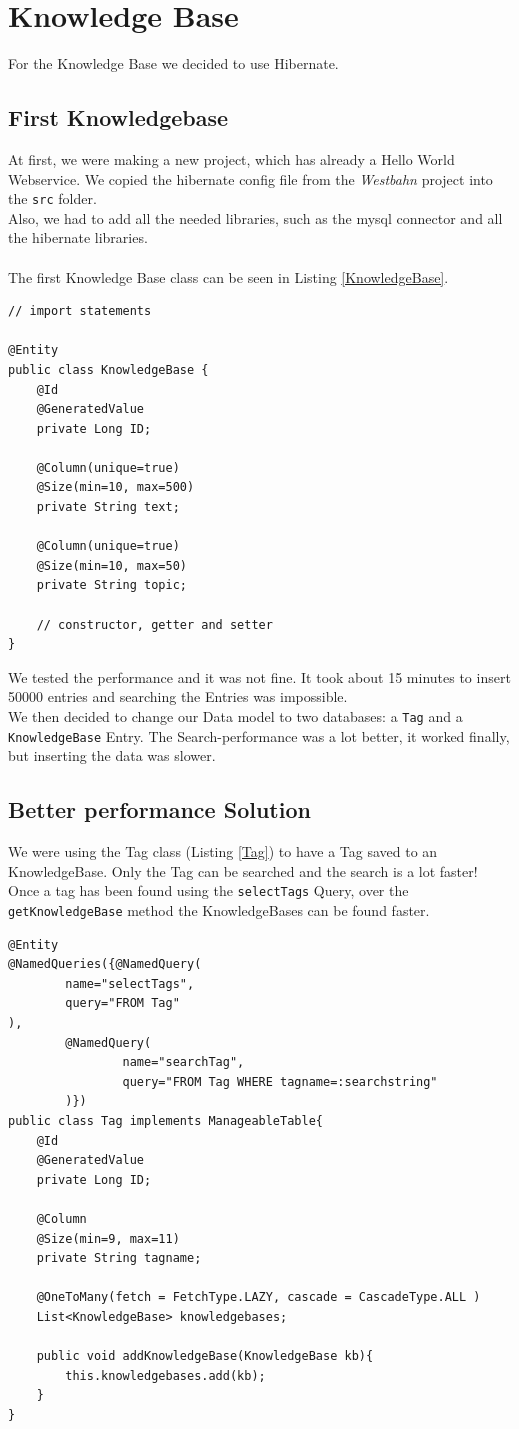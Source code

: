 \documentclass[12pt]{article}
\begin{document}
\section{Knowledge Base}
For the Knowledge Base we decided to use Hibernate.
\subsection{First Knowledgebase}
At first, we were making a new project, which has already a Hello World Webservice. We copied the hibernate config file from the \textit{Westbahn} project into the \texttt{src} folder.\\
Also, we had to add all the needed libraries, such as the mysql connector and all the hibernate libraries.\\
\\
The first Knowledge Base class can be seen in Listing \ref{KnowledgeBase}.
\begin{lstlisting}[caption=KnowledgeBase entity class, label=KnowledgeBase]
// import statements

@Entity
public class KnowledgeBase {
    @Id
    @GeneratedValue
    private Long ID;

    @Column(unique=true)
    @Size(min=10, max=500)
    private String text;

    @Column(unique=true)
    @Size(min=10, max=50)
    private String topic;

	// constructor, getter and setter
}
\end{lstlisting}
We tested the performance and it was not fine.
It took about 15 minutes to insert 50000 entries and searching the Entries was impossible.
\\
We then decided to change our Data model to two databases: a \texttt{Tag} and a \texttt{KnowledgeBase} Entry.
The Search-performance was a lot better, it worked finally, but inserting the data was slower.
\subsection{Better performance Solution}
We were using the Tag class (Listing \ref{Tag}) to have a Tag saved to an KnowledgeBase. Only the Tag can be searched and the search is a lot faster! Once a tag has been found using the \texttt{selectTags} Query, over the \texttt{getKnowledgeBase} method the KnowledgeBases can be found faster.
\begin{lstlisting}[caption= Tag entity class (selection), label=Tag]
@Entity
@NamedQueries({@NamedQuery(
        name="selectTags",
        query="FROM Tag"
),
        @NamedQuery(
                name="searchTag",
                query="FROM Tag WHERE tagname=:searchstring"
        )})
public class Tag implements ManageableTable{
    @Id
    @GeneratedValue
    private Long ID;

    @Column
    @Size(min=9, max=11)
    private String tagname;

    @OneToMany(fetch = FetchType.LAZY, cascade = CascadeType.ALL )
    List<KnowledgeBase> knowledgebases;

    public void addKnowledgeBase(KnowledgeBase kb){
        this.knowledgebases.add(kb);
    }
}
\end{lstlisting}
\end{document}
